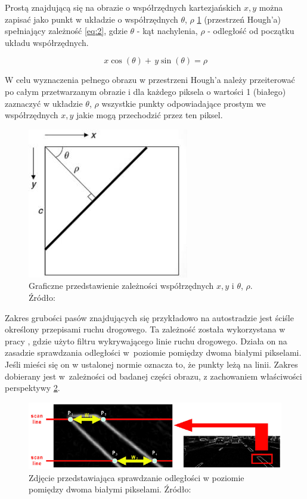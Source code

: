Prostą znajdującą się na obrazie o współrzędnych kartezjańskich ${x,y}$ można zapisać jako punkt w układzie o współrzędnych $\theta$, $\rho$ \ref{fig:rotheta} (przestrzeń Hough'a) spełniający zależność \eqref{eq:2}, gdzie $\theta$ - kąt nachylenia, $\rho$ - odległość od początku układu współrzędnych.

\begin{equation}
\,x\cos(\theta )+\,y\sin(\theta )=\rho \label{eq:2}
\end{equation}


W celu wyznaczenia pełnego obrazu w przestrzeni Hough'a należy przeiterować po całym przetwarzanym obrazie i dla każdego piksela o wartości 1 (białego) zaznaczyć w układzie $\theta$, $\rho$ wszystkie punkty odpowiadające prostym we współrzędnych ${x,y}$ jakie mogą przechodzić przez ten piksel.

\begin{figure}
	\centering
	\includegraphics[scale=0.8]{hough_rotheta.png}
	\caption{Graficzne przedstawienie zależności współrzędnych ${x,y}$ i $\theta$, $\rho$. Źródło: \cite{hough_rotheta}}
	\label{fig:rotheta}
\end{figure}

Zakres grubości pasów znajdujących się przykładowo na autostradzie jest ściśle określony przepisami ruchu drogowego. 
Ta zależność została wykorzystana w pracy \cite{4}, gdzie użyto filtru wykrywającego linie ruchu drogowego. Działa on na zasadzie sprawdzania odległości w~poziomie pomiędzy dwoma białymi pikselami. Jeśli mieści się on w ustalonej normie oznacza to, że punkty leżą na linii.
Zakres dobierany jest w~zależności od badanej części obrazu, z zachowaniem właściwości perspektywy \ref{fig:lmps_sobe}. 



\begin{figure}
	\centering
	\includegraphics[scale=0.6]{lmps_sobe.png}
	\caption{Zdjęcie przedstawiająca sprawdzanie odległości w poziomie pomiędzy dwoma białymi pikselami. Źródło: \cite{4}}
	\label{fig:lmps_sobe}
\end{figure}

